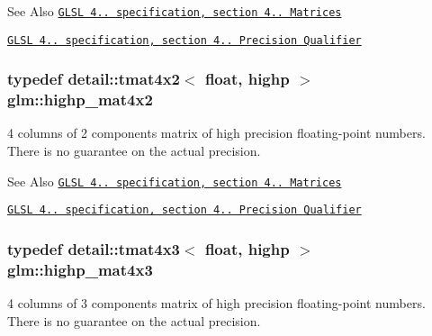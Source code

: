 \begin{DoxySeeAlso}{See Also}
\href{http://www.opengl.org/registry/doc/GLSLangSpec.4.20.8.pdf}{\tt G\-L\-S\-L 4.. specification, section 4.. Matrices} 

\href{http://www.opengl.org/registry/doc/GLSLangSpec.4.20.8.pdf}{\tt G\-L\-S\-L 4.. specification, section 4.. Precision Qualifier} 
\end{DoxySeeAlso}
\hypertarget{group__core__precision_gadf9c4a7947c2b0a79f52cc86a860f270}{
\subsubsection[{highp\-\_\-mat4x2}]{\setlength{\rightskip}{0pt plus 5cm}typedef detail\-::tmat4x2$<$ float, highp $>$ {\bf glm\-::highp\-\_\-mat4x2}}}\label{group__core__precision_gadf9c4a7947c2b0a79f52cc86a860f270}
4 columns of 2 components matrix of high precision floating-\/point numbers. There is no guarantee on the actual precision.

\begin{DoxySeeAlso}{See Also}
\href{http://www.opengl.org/registry/doc/GLSLangSpec.4.20.8.pdf}{\tt G\-L\-S\-L 4.. specification, section 4.. Matrices} 

\href{http://www.opengl.org/registry/doc/GLSLangSpec.4.20.8.pdf}{\tt G\-L\-S\-L 4.. specification, section 4.. Precision Qualifier} 
\end{DoxySeeAlso}
\hypertarget{group__core__precision_gab8dfe989c5100c35ab5dec0e94f59d2a}{
\subsubsection[{highp\-\_\-mat4x3}]{\setlength{\rightskip}{0pt plus 5cm}typedef detail\-::tmat4x3$<$ float, highp $>$ {\bf glm\-::highp\-\_\-mat4x3}}}\label{group__core__precision_gab8dfe989c5100c35ab5dec0e94f59d2a}
4 columns of 3 components matrix of high precision floating-\/point numbers. There is no guarantee on the actual precision.


